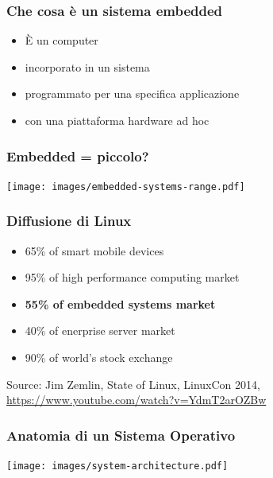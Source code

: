 \documentclass[xetex,table]{beamer}
\begin{document}
\begin{frame}
  \frametitle{Che cosa è un sistema embedded}
  \begin{itemize}
    \item È un computer
    \item {\color{red} incorporato} in un sistema
    \item programmato per {\color{blue} una specifica applicazione}
    \item con una piattaforma {\color[rgb]{0,0.5,0} hardware ad hoc}
  \end{itemize}
\end{frame}

\begin{frame}
\frametitle{Embedded = piccolo?}
  \begin{center}
    \texttt{[image: images/embedded-systems-range.pdf]}
  \end{center}
\end{frame}

\begin{frame}
\frametitle{Diffusione di Linux}
  \begin{itemize}
    \item 65\% of smart mobile devices
    \item 95\% of high performance computing market
    \item \textbf{55\% of embedded systems market}
    \item 40\% of enerprise server market
    \item 90\% of world’s stock exchange
  \end{itemize}
  {\tiny Source: Jim Zemlin, State of Linux, LinuxCon 2014,
    \url{https://www.youtube.com/watch?v=YdmT2arOZBw}}
\end{frame}

\begin{frame}
\frametitle{Anatomia di un Sistema Operativo}
  \begin{center}
    \texttt{[image: images/system-architecture.pdf]}
  \end{center}
\end{frame}
\end{document}
